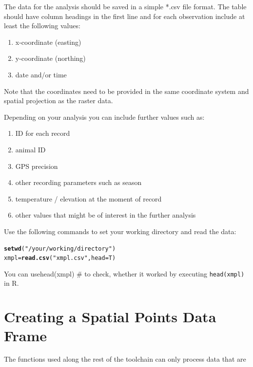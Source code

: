 \documentclass[11pt, a4paper]{article}\usepackage[]{graphicx}\usepackage[]{color}
\makeatletter
\newcommand{\hlstr}[1]{\textcolor[rgb]{0.192,0.494,0.8}{#1}}%
\newcommand{\hlstd}[1]{\textcolor[rgb]{0.345,0.345,0.345}{#1}}%
\newcommand{\hlkwb}[1]{\textcolor[rgb]{0.69,0.353,0.396}{#1}}%
\newcommand{\hlkwc}[1]{\textcolor[rgb]{0.333,0.667,0.333}{#1}}%
\newcommand{\hlkwd}[1]{\textcolor[rgb]{0.737,0.353,0.396}{\textbf{#1}}}%
\newenvironment{kframe}{%
 \def\at@end@of@kframe{}%
 \ifinner\ifhmode%
  \def\at@end@of@kframe{\end{minipage}}%
  \begin{minipage}{\columnwidth}%
 \fi\fi%
 \def\FrameCommand##1{\hskip\@totalleftmargin \hskip-\fboxsep
 \colorbox{shadecolor}{##1}\hskip-\fboxsep
     \hskip-\linewidth \hskip-\@totalleftmargin \hskip\columnwidth}%
 \MakeFramed {\advance\hsize-\width
   \@totalleftmargin\z@ \linewidth\hsize
   \@setminipage}}%
 {\par\unskip\endMakeFramed%
 \at@end@of@kframe}
\newenvironment{knitrout}{}{} %
\makeatother
\begin{document}
The data for the analysis should be saved in a simple *.csv file format. The table should have column headings in the first line and for each observation include at least the following values: 
\begin{enumerate}
\item{x-coordinate (easting)}
\item{y-coordinate (northing)}
\item{date and/or time}
\end{enumerate}

\noindent Note that the coordinates need to be provided in the same coordinate system and spatial projection as the raster data.

Depending on your analysis you can include further values such as:
\begin{enumerate}
\item{ID for each record}
\item{animal ID}
\item{GPS precision}
\item{other recording parameters such as season}
\item{temperature / elevation at the moment of record}
\item{other values that might be of interest in the further analysis}
\end{enumerate}


\noindent Use the following commands to set your working directory and read the data:
\begin{knitrout}
\color{fgcolor}\begin{kframe}
\begin{alltt}
\hlkwd{setwd}\hlstd{(}\hlstr{"/your/working/directory"}\hlstd{)}
\hlstd{xmpl} \hlkwb{=} \hlkwd{read.csv}\hlstd{(}\hlstr{"xmpl.csv"}\hlstd{,} \hlkwc{head}\hlstd{=T)}
\end{alltt}
\end{kframe}
\end{knitrout}

You can usehead(xmpl) # to check, whether it worked by executing \texttt{head(xmpl)} in R.



\section{Creating a Spatial Points Data Frame}%
The functions used along the rest of the toolchain can only process data that are 
\end{document}
